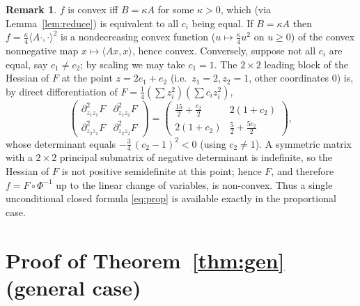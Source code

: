 \documentclass{amsart}
\theoremstyle{definition}
\newtheorem{remark}{Remark}
\begin{document}
\begin{remark}\label{rem:nonconvex}
$f$ is convex iff $B=\kappa A$ for some $\kappa>0$, which (via Lemma~\ref{lem:reduce}) is equivalent
to all $c_i$ being equal.  If $B=\kappa A$ then $f=\tfrac\kappa4\langle A\cdot,\cdot\rangle^2$ is a
nondecreasing convex function ($u\mapsto\tfrac\kappa4u^2$ on $u\ge0$) of the convex nonnegative map
$x\mapsto\langle Ax,x\rangle$, hence convex.  Conversely, suppose not all $c_i$ are equal, say
$c_1\ne c_2$; by scaling we may take $c_1=1$.  The $2\times2$ leading block of the Hessian of $F$ at
the point $z=2e_1+e_2$ (i.e.\ $z_1=2,z_2=1$, other coordinates $0$) is, by direct differentiation of
$F=\tfrac14(\sum z_i^2)(\sum c_iz_i^2)$,
\[
\begin{pmatrix}
\partial^2_{z_1z_1}F & \partial^2_{z_1z_2}F\\[2pt]
\partial^2_{z_2z_1}F & \partial^2_{z_2z_2}F
\end{pmatrix}
=\begin{pmatrix} \tfrac{15}{2}+\tfrac{c_2}{2} & 2(1+c_2)\\[2pt] 2(1+c_2) & \tfrac{5}{2}+\tfrac{5c_2}{2}\end{pmatrix},
\]
whose determinant equals $-\tfrac34\,(c_2-1)^2<0$ (using $c_2\ne1$).  A symmetric matrix with a
$2\times2$ principal submatrix of negative determinant is indefinite, so the Hessian of $F$ is not
positive semidefinite at this point; hence $F$, and therefore $f=F\circ\Phi^{-1}$ up to the linear
change of variables, is non-convex.  Thus a single unconditional closed formula \eqref{eq:prop} is
available exactly in the proportional case.
\end{remark}

\section{Proof of Theorem~\ref{thm:gen} (general case)}
\end{document}

